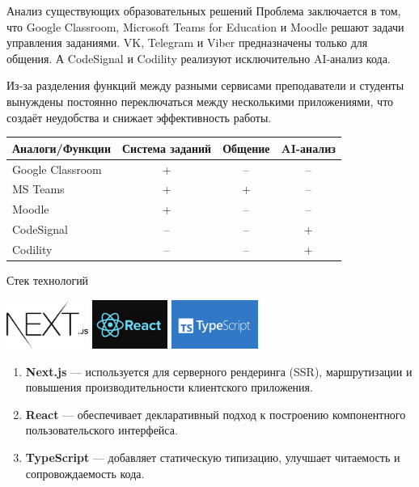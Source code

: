 \documentclass[aspectratio=169]{beamer}
\begin{document}
\begin{frame}{Анализ существующих образовательных решений}
\small
\justifying
Проблема заключается в том, что Google Classroom, Microsoft Teams for Education и Moodle решают задачи управления заданиями. VK, Telegram и Viber предназначены только для общения. А CodeSignal и Codility реализуют исключительно AI-анализ кода.

\vspace{0.8em}

Из-за разделения функций между разными сервисами преподаватели и студенты вынуждены постоянно переключаться между несколькими приложениями, что создаёт неудобства и снижает эффективность работы.

\vspace{1em}

\centering
\begin{tabular}{lccc}
\hline
\textbf{Аналоги/Функции} & Система заданий & Общение & AI-анализ \\
\hline
Google Classroom & + & -- & -- \\
MS Teams         & + & +  & -- \\
Moodle           & + & -- & -- \\
CodeSignal       & -- & -- & +  \\
Codility         & -- & -- & +  \\
\hline
\end{tabular}
\end{frame}

\begin{frame}{Стек технологий}

\centering
\includegraphics[height=1.6cm]{static/nextjs-logo.png} \hspace{1cm}
\includegraphics[height=1.6cm]{static/react-logo.png} \hspace{1cm}
\includegraphics[height=1.6cm]{static/typescript-logo.png}

\vspace{1.5em}
\small
\begin{enumerate}
  \item \textbf{Next.js} — используется для серверного рендеринга (SSR), маршрутизации и повышения производительности клиентского приложения.
  \item \textbf{React} — обеспечивает декларативный подход к построению компонентного пользовательского интерфейса.
  \item \textbf{TypeScript} — добавляет статическую типизацию, улучшает читаемость и сопровождаемость кода.
\end{enumerate}
\end{frame}
\end{document}
